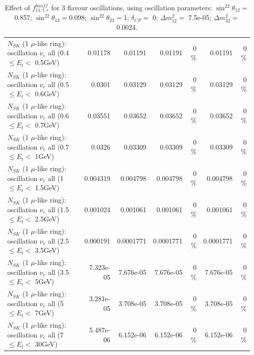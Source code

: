 \begin{table}
\begin{tabular}{| l | r | r | r  r | r  r |}
$N_{SK}$ (1 $\mu$-like ring): oscillation $\nu_{e}$ all (0.4 $\leq E_{t} <$ 0.5GeV) &         0.01178 &         0.01191 &         0.01191 &        0 \%  &         0.01191 &        0 \%  \\ 
$N_{SK}$ (1 $\mu$-like ring): oscillation $\nu_{e}$ all (0.5 $\leq E_{t} <$ 0.6GeV) &          0.0301 &         0.03129 &         0.03129 &        0 \%  &         0.03129 &        0 \%  \\ 
$N_{SK}$ (1 $\mu$-like ring): oscillation $\nu_{e}$ all (0.6 $\leq E_{t} <$ 0.7GeV) &         0.03551 &         0.03652 &         0.03652 &        0 \%  &         0.03652 &        0 \%  \\ 
$N_{SK}$ (1 $\mu$-like ring): oscillation $\nu_{e}$ all (0.7 $\leq E_{t} <$ 1GeV) &          0.0326 &         0.03309 &         0.03309 &        0 \%  &         0.03309 &        0 \%  \\ 
$N_{SK}$ (1 $\mu$-like ring): oscillation $\nu_{e}$ all (1 $\leq E_{t} <$ 1.5GeV) &        0.004319 &        0.004798 &        0.004798 &        0 \%  &        0.004798 &        0 \%  \\ 
$N_{SK}$ (1 $\mu$-like ring): oscillation $\nu_{e}$ all (1.5 $\leq E_{t} <$ 2.5GeV) &        0.001024 &        0.001061 &        0.001061 &        0 \%  &        0.001061 &        0 \%  \\ 
$N_{SK}$ (1 $\mu$-like ring): oscillation $\nu_{e}$ all (2.5 $\leq E_{t} <$ 3.5GeV) &        0.000191 &       0.0001771 &       0.0001771 &        0 \%  &       0.0001771 &        0 \%  \\ 
$N_{SK}$ (1 $\mu$-like ring): oscillation $\nu_{e}$ all (3.5 $\leq E_{t} <$ 5GeV) &       7.323e-05 &       7.676e-05 &       7.676e-05 &        0 \%  &       7.676e-05 &        0 \%  \\ 
 $N_{SK}$ (1 $\mu$-like ring): oscillation $\nu_{e}$ all (5 $\leq E_{t} <$ 7GeV) &       3.281e-05 &       3.708e-05 &       3.708e-05 &        0 \%  &       3.708e-05 &        0 \%  \\ 
$N_{SK}$ (1 $\mu$-like ring): oscillation $\nu_{e}$ all (7 $\leq E_{t} <$ 30GeV) &       5.487e-06 &       6.152e-06 &       6.152e-06 &        0 \%  &       6.152e-06 &        0 \%  \\ 
\hline
\hline
\end{tabular}
\caption{ Effect of $f_{11; t, r}^{banff}$ for 3 flavour oscillations, using oscillation parameters:  $\sin^22\theta_{12} = $0.857; $\sin^22\theta_{13} = $0.098; $\sin^22\theta_{23} = $1; $\delta_{CP} = $        0; $\Delta m^2_{12} = $    7.5e-05; $\Delta m^2_{32} = $    0.0024. }
\label{tab:num_banff_11_1RmuT_3f_osc_t13:0.098}
\end{table}
